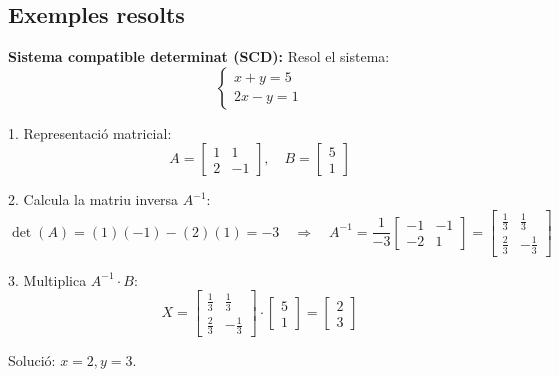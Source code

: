 \documentclass[12pt]{article}
\begin{document}
\subsection*{Exemples resolts}

\begin{exemple}
\textbf{Sistema compatible determinat (SCD):}
Resol el sistema:
\[
\begin{cases}
x + y = 5 \\
2x - y = 1
\end{cases}
\]

1. Representació matricial:
\[
A =
\begin{bmatrix}
1 & 1 \\
2 & -1
\end{bmatrix}, \quad
B =
\begin{bmatrix}
5 \\ 1
\end{bmatrix}
\]

2. Calcula la matriu inversa \(A^{-1}\):
\[
\det(A) = (1)(-1) - (2)(1) = -3 \quad \Rightarrow \quad A^{-1} = \frac{1}{-3}
\begin{bmatrix}
-1 & -1 \\
-2 & 1
\end{bmatrix} =
\begin{bmatrix}
\frac{1}{3} & \frac{1}{3} \\
\frac{2}{3} & -\frac{1}{3}
\end{bmatrix}
\]

3. Multiplica \(A^{-1} \cdot B\):
\[
X =
\begin{bmatrix}
\frac{1}{3} & \frac{1}{3} \\
\frac{2}{3} & -\frac{1}{3}
\end{bmatrix}
\cdot
\begin{bmatrix}
5 \\ 1
\end{bmatrix}
=
\begin{bmatrix}
2 \\ 3
\end{bmatrix}
\]

Solució: \(x = 2, y = 3\).
\end{exemple}
\end{document}
